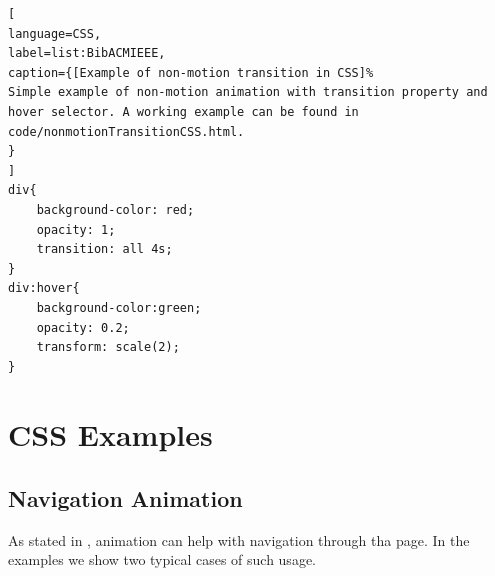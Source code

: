 \begin{lstlisting}[
language=CSS,
label=list:BibACMIEEE,
caption={[Example of non-motion transition in CSS]%
Simple example of non-motion animation with transition property and hover selector. A working example can be found in code/nonmotionTransitionCSS.html.
}
]
div{
	background-color: red;
	opacity: 1;
	transition: all 4s;
}
div:hover{
	background-color:green;
	opacity: 0.2;
	transform: scale(2);
}
\end{lstlisting}



\section{CSS Examples} %
\label{sec:CSS_Examples}


\subsection{Navigation Animation} %
\label{sub:navigationCSS}

As stated in , animation can help with navigation through tha page. In the examples we show two typical cases of such usage.

\label{subsub:hamburger}

\citet{vtldesign}
\citep{vtldesign}

